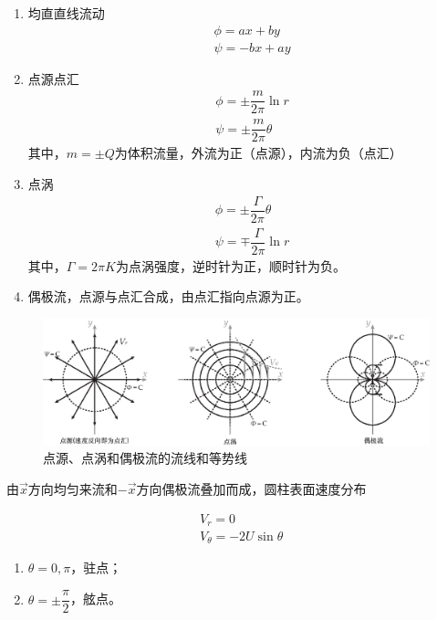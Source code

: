 \begin{enumerate}
	\item 均直直线流动
	\begin{align*}
		&\phi = ax + by\\
		&\psi = -bx + ay
	\end{align*}
    \item 点源点汇
    \begin{align*}
    	&\phi = \pm \dfrac{m}{2\pi} \ln r\\
    	&\psi = \pm \dfrac{m}{2\pi} \theta
    \end{align*}
    其中，$m = \pm Q$为体积流量，外流为正（点源），内流为负（点汇）
    \item 点涡
    \begin{align*}
    	&\phi = \pm \dfrac{\varGamma}{2\pi} \theta\\
    	&\psi = \mp \dfrac{\varGamma}{2\pi} \ln r
    \end{align*}
    其中，$\varGamma = 2\pi K$为点涡强度，逆时针为正，顺时针为负。
    \item 偶极流，点源与点汇合成，由点汇指向点源为正。
\end{enumerate}

\begin{figure}[H]
	\centering
	\includegraphics[scale=0.6]{figures/点源点涡偶极流.eps}
	\caption{点源、点涡和偶极流的流线和等势线}
\end{figure}



由$\vec{x}$方向均匀来流和$-\vec{x}$方向偶极流叠加而成，圆柱表面速度分布

\begin{align*}
	&V_r = 0\\
	&V_{\theta} = -2U \sin \theta 
\end{align*}

\begin{enumerate}
	\item $\theta = 0, \pi$，驻点；
	\item $\theta = \pm \dfrac{\pi}{2}$，舷点。
\end{enumerate}


